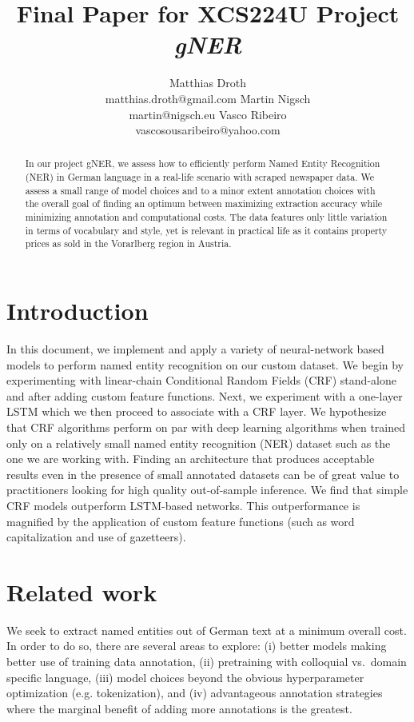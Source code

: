 \documentclass[11pt]{article}
\title{Final Paper for XCS224U Project \emph{gNER}}
\author{
	Matthias Droth\\
	matthias.droth@gmail.com
	\And
	Martin Nigsch\\
	martin@nigsch.eu
	\And
	Vasco Ribeiro\\
	vascosousaribeiro@yahoo.com
}
\begin{document}
\maketitle

\begin{abstract}
In our project gNER, we assess how to efficiently perform Named Entity Recognition (NER) in German language in a real-life scenario with scraped newspaper data. We assess a small range of model choices and to a minor extent annotation choices with the overall goal of finding an optimum between maximizing extraction accuracy while minimizing annotation and computational costs. The data features only little variation in terms of vocabulary and style, yet is relevant in practical life as it contains property prices as sold in the Vorarlberg region in Austria.
\end{abstract}

\section{Introduction}
In this document, we implement and apply a variety of neural-network based models to perform named entity recognition on our custom dataset. We begin by experimenting with linear-chain Conditional Random Fields (CRF) stand-alone and after adding custom feature functions. Next, we experiment with a one-layer LSTM which we then proceed to associate with a CRF layer. 
\newline We hypothesize that CRF algorithms perform on par with deep learning algorithms when trained only on a relatively small named entity recognition (NER) dataset such as the one we are working with. Finding an architecture that produces acceptable results even in the presence of small annotated datasets can be of great value to practitioners looking for high quality out-of-sample inference.
\newline We find that simple CRF models outperform LSTM-based networks. This outperformance is magnified by the application of custom feature functions (such as word capitalization and use of gazetteers).

\section{Related work}
We seek to extract named entities out of German text at a minimum overall cost. In order to do so, there are several areas to explore: (i) better models making better use of training data annotation, (ii) pretraining with colloquial vs.~domain specific language, (iii)  model choices beyond the obvious hyperparameter optimization (e.g. tokenization), and (iv) advantageous annotation strategies where the marginal benefit of adding more annotations is the greatest. 
\end{document}
